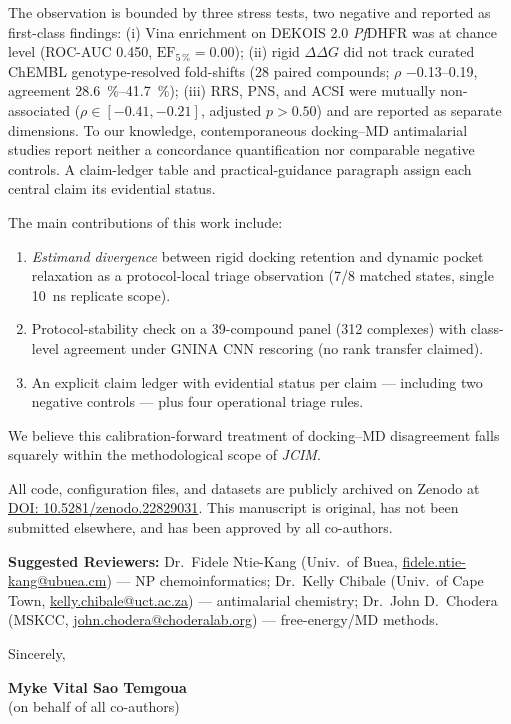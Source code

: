 \documentclass[11pt,letterpaper]{article}
\begin{document}
The observation is bounded by three stress tests, two negative and reported as first-class findings: (i) Vina enrichment on DEKOIS 2.0 \textit{Pf}DHFR was at chance level (ROC-AUC \num{0.450}, $\mathrm{EF}_{5\,\%} = \num{0.00}$); (ii) rigid $\Delta\Delta G$ did not track curated ChEMBL genotype-resolved fold-shifts (28 paired compounds; $\rho$ \numrange{-0.13}{0.19}, agreement \qtyrange{28.6}{41.7}{\percent}); (iii) RRS, PNS, and ACSI were mutually non-associated ($\rho \in [-0.41, -0.21]$, adjusted $p > 0.50$) and are reported as separate dimensions. To our knowledge, contemporaneous docking--MD antimalarial studies report neither a concordance quantification nor comparable negative controls. A claim-ledger table and practical-guidance paragraph assign each central claim its evidential status.

The main contributions of this work include:
\begin{enumerate}[leftmargin=1.2em]
  \item \textit{Estimand divergence} between rigid docking retention and dynamic pocket relaxation as a protocol-local triage observation (7/8 matched states, single \qty{10}{\ns} replicate scope).
  \item Protocol-stability check on a 39-compound panel (\num{312} complexes) with class-level agreement under GNINA CNN rescoring (no rank transfer claimed).
  \item An explicit claim ledger with evidential status per claim --- including two negative controls --- plus four operational triage rules.
\end{enumerate}

We believe this calibration-forward treatment of docking--MD disagreement falls squarely within the methodological scope of \textit{JCIM}.

All code, configuration files, and datasets are publicly archived on Zenodo at \href{https://doi.org/10.5281/zenodo.22829031}{DOI: 10.5281/zenodo.22829031}. This manuscript is original, has not been submitted elsewhere, and has been approved by all co-authors.

\vspace{0.2em}
\noindent\textbf{Suggested Reviewers:} Dr.\ Fidele Ntie-Kang (Univ.\ of Buea, \href{mailto:fidele.ntie-kang@ubuea.cm}{fidele.ntie-kang@ubuea.cm}) --- NP chemoinformatics; Dr.\ Kelly Chibale (Univ.\ of Cape Town, \href{mailto:kelly.chibale@uct.ac.za}{kelly.chibale@uct.ac.za}) --- antimalarial chemistry; Dr.\ John D.\ Chodera (MSKCC, \href{mailto:john.chodera@choderalab.org}{john.chodera@choderalab.org}) --- free-energy/MD methods.

\vspace{0.2em}
\noindent Sincerely,

\vspace{0.1em}

\noindent \textbf{Myke Vital Sao Temgoua} \\
(on behalf of all co-authors)
\end{document}
